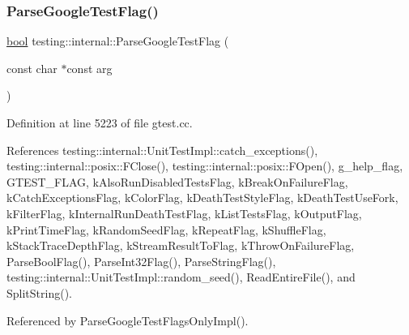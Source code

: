 \subsubsection{\texorpdfstring{Parse\+Google\+Test\+Flag()}{ParseGoogleTestFlag()}}
{\footnotesize\ttfamily \hyperlink{classbool}{bool} testing\+::internal\+::\+Parse\+Google\+Test\+Flag (\begin{DoxyParamCaption}\item[{const char $\ast$const}]{arg }\end{DoxyParamCaption})}



Definition at line 5223 of file gtest.\+cc.



References testing\+::internal\+::\+Unit\+Test\+Impl\+::catch\+\_\+exceptions(), testing\+::internal\+::posix\+::\+F\+Close(), testing\+::internal\+::posix\+::\+F\+Open(), g\+\_\+help\+\_\+flag, G\+T\+E\+S\+T\+\_\+\+F\+L\+AG, k\+Also\+Run\+Disabled\+Tests\+Flag, k\+Break\+On\+Failure\+Flag, k\+Catch\+Exceptions\+Flag, k\+Color\+Flag, k\+Death\+Test\+Style\+Flag, k\+Death\+Test\+Use\+Fork, k\+Filter\+Flag, k\+Internal\+Run\+Death\+Test\+Flag, k\+List\+Tests\+Flag, k\+Output\+Flag, k\+Print\+Time\+Flag, k\+Random\+Seed\+Flag, k\+Repeat\+Flag, k\+Shuffle\+Flag, k\+Stack\+Trace\+Depth\+Flag, k\+Stream\+Result\+To\+Flag, k\+Throw\+On\+Failure\+Flag, Parse\+Bool\+Flag(), Parse\+Int32\+Flag(), Parse\+String\+Flag(), testing\+::internal\+::\+Unit\+Test\+Impl\+::random\+\_\+seed(), Read\+Entire\+File(), and Split\+String().



Referenced by Parse\+Google\+Test\+Flags\+Only\+Impl().


